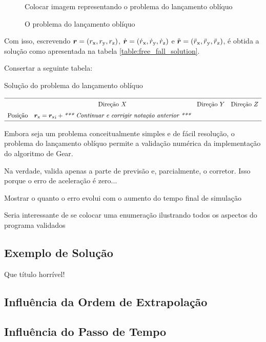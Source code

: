 \begin{figure}[h]
	\caption{O problema do lançamento oblíquo}
	\begin{center}
		\alert{Colocar imagem representando o problema do lançamento oblíquo}
	\end{center}
	\label{fig:free_fall}
\end{figure}

Com isso, escrevendo \(\position = \explicitVectorCoordinates{\positionScalar}\), \(\velocity = \explicitVectorCoordinates{\velocityScalar}\) e \(\acceleration = \explicitVectorCoordinates{\accelerationScalar}\), é obtida a solução como apresentada na tabela \ref{table:free_fall_solution}.

\alert{Consertar a seguinte tabela:}

\begin{table}[h]
	\caption{Solução do problema do lançamento oblíquo}
	\label{table:free_fall_solution}

	\begin{equation*}
		\def\arraystretch{1.5}
		\begin{array}{lccc}
	\hline
		& \text{Direção } \xAxis & \text{Direção } \yAxis & \text{Direção } \zAxis \\
		\text{Posição} & \xComponent{\position} = \initial{\xComponent{\position}} + \alert{Continuar e corrigir notação anterior} & & \\
	\hline	
		\end{array}
	\end{equation*}
\end{table}

Embora seja um problema conceitualmente simples e de fácil resolução, o problema do lançamento oblíquo permite a validação numérica da implementação do algoritmo de Gear.

\alert{Na verdade, valida apenas a parte de previsão e, parcialmente, o corretor. Isso porque o erro de aceleração é zero...}

\alert{Mostrar o quanto o erro evolui com o aumento do tempo final de simulação}

\alert{Seria interessante de se colocar uma enumeração ilustrando todos os aspectos do programa validados}

\subsection{Exemplo de Solução} \alert{Que título horrível!}



\subsection{Influência da Ordem de Extrapolação}

\subsection{Influência do Passo de Tempo}